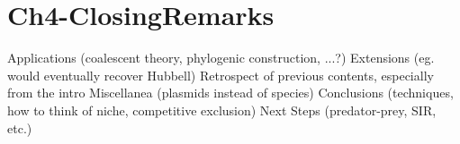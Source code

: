 \chapter{Ch4-ClosingRemarks}

Applications (coalescent theory, phylogenic construction, ...?)
Extensions (eg. would eventually recover Hubbell)
Retrospect of previous contents, especially from the intro
Miscellanea (plasmids instead of species)
Conclusions (techniques, how to think of niche, competitive exclusion)
Next Steps (predator-prey, SIR, etc.)

